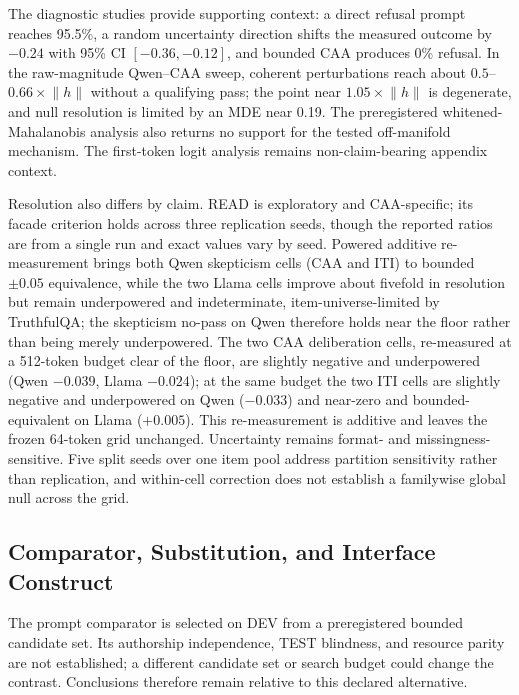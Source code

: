 \documentclass[manuscript,review,anonymous]{acmart}
\begin{document}
The diagnostic studies provide supporting context: a direct refusal prompt reaches 95.5\%, a random uncertainty direction shifts the measured outcome by \(-0.24\) with 95\% CI \([-0.36,-0.12]\), and bounded CAA produces 0\% refusal. {}%
{}%
In the raw-magnitude Qwen--CAA sweep, coherent perturbations reach about \(0.5\)--\(0.66\times\lVert h\rVert\) without a qualifying pass; the point near \(1.05\times\lVert h\rVert\) is degenerate, and null resolution is limited by an MDE near 0.19. {}%
{}%
{}%
The preregistered whitened-Mahalanobis analysis also returns no support for the tested off-manifold mechanism. {}%
The first-token logit analysis remains non-claim-bearing appendix context.

Resolution also differs by claim. READ is exploratory and CAA-specific; its facade criterion holds across three replication seeds, though the reported ratios are from a single run and exact values vary by seed. {}%
{}%
Powered additive re-measurement brings both Qwen skepticism cells (CAA and ITI) to bounded \(\pm0.05\) equivalence, while the two Llama cells improve about fivefold in resolution but remain underpowered and indeterminate, item-universe-limited by TruthfulQA; the skepticism no-pass on Qwen therefore holds near the floor rather than being merely underpowered. The two CAA deliberation cells, re-measured at a 512-token budget clear of the floor, are slightly negative and underpowered (Qwen \(-0.039\), Llama \(-0.024\)); at the same budget the two ITI cells are slightly negative and underpowered on Qwen (\(-0.033\)) and near-zero and bounded-equivalent on Llama (\(+0.005\)). This re-measurement is additive and leaves the frozen 64-token grid unchanged. Uncertainty remains format- and missingness-sensitive. {}%
{}%
{}%
{}%
Five split seeds over one item pool address partition sensitivity rather than replication, and within-cell correction does not establish a familywise global null across the grid. {}%
{}%

\subsection{Comparator, Substitution, and Interface Construct}\label{comparator-substitution-and-interface-construct}

The prompt comparator is selected on DEV from a preregistered bounded candidate set. Its authorship independence, TEST blindness, and resource parity are not established; a different candidate set or search budget could change the contrast. {}%
{}%
Conclusions therefore remain relative to this declared alternative.
\end{document}
